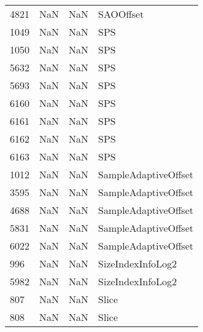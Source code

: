 \begin{tabular}{llll}
4821 &                   NaN &                        NaN &                                 SAOOffset \\
1049 &                   NaN &                        NaN &                                       SPS \\
1050 &                   NaN &                        NaN &                                       SPS \\
5632 &                   NaN &                        NaN &                                       SPS \\
5693 &                   NaN &                        NaN &                                       SPS \\
6160 &                   NaN &                        NaN &                                       SPS \\
6161 &                   NaN &                        NaN &                                       SPS \\
6162 &                   NaN &                        NaN &                                       SPS \\
6163 &                   NaN &                        NaN &                                       SPS \\
1012 &                   NaN &                        NaN &                      SampleAdaptiveOffset \\
3595 &                   NaN &                        NaN &                      SampleAdaptiveOffset \\
4688 &                   NaN &                        NaN &                      SampleAdaptiveOffset \\
5831 &                   NaN &                        NaN &                      SampleAdaptiveOffset \\
6022 &                   NaN &                        NaN &                      SampleAdaptiveOffset \\
996  &                   NaN &                        NaN &                         SizeIndexInfoLog2 \\
5982 &                   NaN &                        NaN &                         SizeIndexInfoLog2 \\
807  &                   NaN &                        NaN &                                     Slice \\
808  &                   NaN &                        NaN &                                     Slice \\

\end{tabular}
